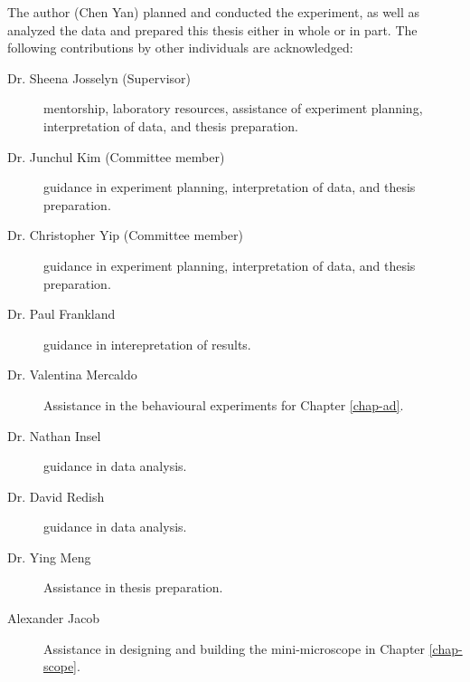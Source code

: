 The author (Chen Yan) planned and conducted the experiment, as well as analyzed the data and prepared this thesis either in whole or in part. The following contributions by other individuals are acknowledged:
\begin{description}

\item[Dr. Sheena Josselyn (Supervisor)] mentorship, laboratory resources, assistance of experiment planning, interpretation of data, and thesis preparation.

\item[Dr. Junchul Kim (Committee member)] guidance in experiment planning, interpretation of data, and thesis preparation.

\item[Dr. Christopher Yip (Committee member)] guidance in experiment planning, interpretation of data, and thesis preparation.

\item[Dr. Paul Frankland] guidance in interepretation of results.

\item[Dr. Valentina Mercaldo] Assistance in the behavioural experiments for Chapter \ref{chap-ad}.

\item[Dr. Nathan Insel] guidance in data analysis.

\item[Dr. David Redish] guidance in data analysis. 

\item[Dr. Ying Meng] Assistance in thesis preparation.

\item[Alexander Jacob] Assistance in designing and building the mini-microscope in Chapter \ref{chap-scope}.

\end{description}
